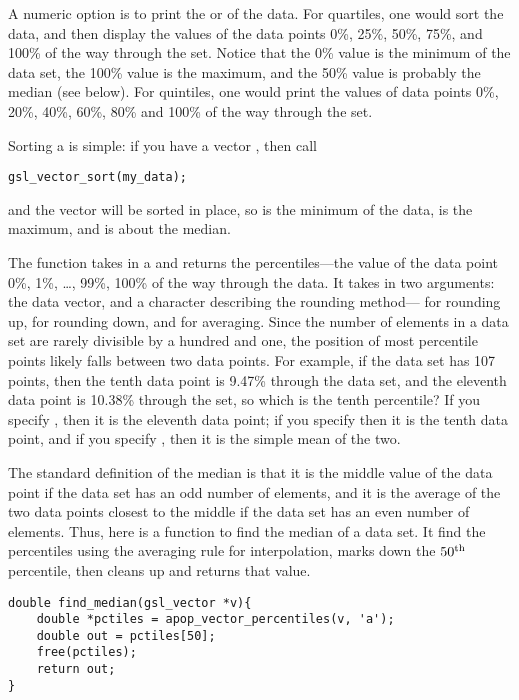 A numeric option is to print the  or  of the
data. For quartiles, one would sort the data, and then display the 
values of the data points 0\%, 25\%, 50\%, 75\%, and 100\% of the
way through the set. Notice that the 0\% value is the minimum of the data
set, the 100\% value is the maximum, and the 50\% value is probably the
median (see below). For quintiles, one would print the
values of data points  0\%, 20\%, 40\%, 60\%, 80\% and 100\% of the way
through the set.

Sorting  a  is 
simple: if you have a vector , then call
\begin{lstlisting}
gsl_vector_sort(my_data);
\end{lstlisting}
and the vector will be sorted in place, so
 is the minimum of the data,
 is the maximum, and 
 is about the median.

The function  takes in a
 and returns the percentiles---the value of the
data point 0\%, 1\%, \dots, 99\%, 100\% of the way through the data.
It takes in two arguments: the data vector, and a character describing
the rounding method--- for rounding up,  for rounding
down, and  for averaging. Since the number of elements in a
data set are rarely divisible by a hundred and one, the position of most
percentile points likely falls between two data points. For example, if
the data set has 107 points, then the tenth data point is 9.47\% through
the data set, and the eleventh data point is 10.38\% through the set, so
which is the tenth percentile? If you specify , then it is the
eleventh data point; if you specify  then it is the tenth data
point, and if you specify , then it is the simple mean of the two.

The standard definition of the median is that it is the middle
value of the data point if the data set has an odd number of elements,
and it is the average of the two data points closest to the middle if
the data set has an even number of elements. 
Thus, here is a function to find the median of a data set. It find the
percentiles using the averaging rule for interpolation, marks down the
$50^{\rm th}$ percentile, then cleans up and returns that value.
\begin{lstlisting}
double find_median(gsl_vector *v){
    double *pctiles = apop_vector_percentiles(v, 'a');
    double out = pctiles[50];
    free(pctiles);
    return out;
}
\end{lstlisting}

